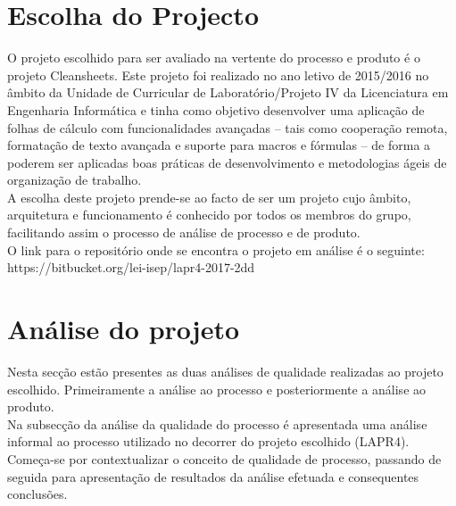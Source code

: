 \documentclass[openany,10pt,a4paper]{article}
\begin{document}
\section{Escolha do Projecto}
O projeto escolhido para ser avaliado na vertente do processo e produto é o projeto Cleansheets. Este projeto foi realizado no ano letivo de 2015/2016 no âmbito da Unidade de Curricular de Laboratório/Projeto IV da Licenciatura em Engenharia Informática e tinha como objetivo desenvolver uma aplicação de folhas de cálculo com funcionalidades avançadas – tais como cooperação remota, formatação de texto avançada e suporte para macros e fórmulas – de forma a poderem ser aplicadas boas práticas de desenvolvimento e metodologias ágeis de organização de trabalho.\\
A escolha deste projeto prende-se ao facto de ser um projeto cujo âmbito, arquitetura e funcionamento é conhecido por todos os membros do grupo, facilitando assim o processo de análise de processo e de produto. \\
O link para o repositório onde se encontra o projeto em análise é o seguinte: https://bitbucket.org/lei-isep/lapr4-2017-2dd

\section{Análise do projeto}
Nesta secção estão presentes as duas análises de qualidade realizadas ao projeto escolhido. Primeiramente a análise ao processo e posteriormente a análise ao produto. \\
Na subsecção da análise da qualidade do processo é apresentada uma análise informal ao processo utilizado no decorrer do projeto escolhido (LAPR4). Começa-se por contextualizar o conceito de qualidade de processo, passando de seguida para apresentação de resultados da análise efetuada e consequentes conclusões. \\
\end{document}
